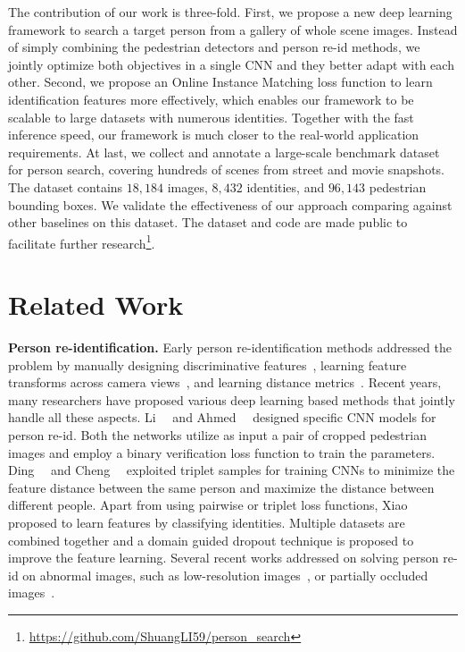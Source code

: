 The contribution of our work is three-fold. First, we propose a new deep learning framework to search a target person from a gallery of whole scene images. Instead of simply combining the pedestrian detectors and person re-id methods, we jointly optimize both objectives in a single CNN and they better adapt with each other. Second, we propose an Online Instance Matching loss function to learn identification features more effectively, which enables our framework to be scalable to large datasets with numerous identities. Together with the fast inference speed, our framework is much closer to the real-world application requirements. At last, we collect and annotate a large-scale benchmark dataset for person search, covering hundreds of scenes from street and movie snapshots. The dataset contains $18,184$ images, $8,432$ identities, and $96,143$ pedestrian bounding boxes. We validate the effectiveness of our approach comparing against other baselines on this dataset. The dataset and code are made public to facilitate further research\footnote{\url{https://github.com/ShuangLI59/person_search}}.

\section{Related Work} %
\label{sec:related_work}
\textbf{Person re-identification.} Early person re-identification methods addressed the problem by manually designing discriminative features~\cite{wang2007shape,hamdoun2008person,zhao2013unsupervised}, learning feature transforms across camera views~\cite{prosser2010person,porikli2003inter,shen2015person}, and learning distance metrics~\cite{zheng2011person,gray2008viewpoint,prosser2010person,paisitkriangkrai2015learning,liao2015efficient}. Recent years, many researchers have proposed various deep learning based methods that jointly handle all these aspects. Li~\etal~\cite{li2014deepreid} and Ahmed~\etal~\cite{ahmed2015improved} designed specific CNN models for person re-id. Both the networks utilize as input a pair of cropped pedestrian images and employ a binary verification loss function to train the parameters. Ding~\etal~\cite{ding2015deep} and Cheng~\etal~\cite{cheng2016person} exploited triplet samples for training CNNs to minimize the feature distance between the same person and maximize the distance between different people. Apart from using pairwise or triplet loss functions, Xiao~\etal~\cite{xiao2016learning} proposed to learn features by classifying identities. Multiple datasets are combined together and a domain guided dropout technique is proposed to improve the feature learning. Several recent works addressed on solving person re-id on abnormal images, such as low-resolution images~\cite{li2015multi}, or partially occluded images~\cite{zheng2015partial}.


